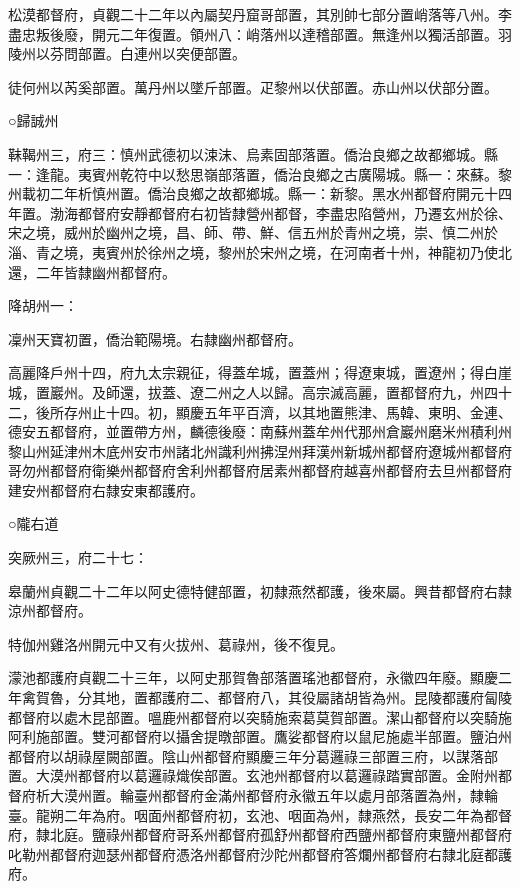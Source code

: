 \begin{pinyinscope}
 松漠都督府，貞觀二十二年以內屬契丹窟哥部置，其別帥七部分置峭落等八州。李盡忠叛後廢，開元二年復置。領州八：峭落州以達稽部置。無逢州以獨活部置。羽陵州以芬問部置。白連州以突便部置。



 徒何州以芮奚部置。萬丹州以墜斤部置。疋黎州以伏部置。赤山州以伏部分置。



 ○歸誠州



 靺鞨州三，府三：慎州武德初以涑沫、烏素固部落置。僑治良鄉之故都鄉城。縣一：逢龍。夷賓州乾符中以愁思嶺部落置，僑治良鄉之古廣陽城。縣一：來蘇。黎州載初二年析慎州置。僑治良鄉之故都鄉城。縣一：新黎。黑水州都督府開元十四年置。渤海都督府安靜都督府右初皆隸營州都督，李盡忠陷營州，乃遷玄州於徐、宋之境，威州於幽州之境，昌、師、帶、鮮、信五州於青州之境，崇、慎二州於淄、青之境，夷賓州於徐州之境，黎州於宋州之境，在河南者十州，神龍初乃使北還，二年皆隸幽州都督府。



 降胡州一：



 凜州天寶初置，僑治範陽境。右隸幽州都督府。



 高麗降戶州十四，府九太宗親征，得蓋牟城，置蓋州；得遼東城，置遼州；得白崖城，置巖州。及師還，拔蓋、遼二州之人以歸。高宗滅高麗，置都督府九，州四十二，後所存州止十四。初，顯慶五年平百濟，以其地置熊津、馬韓、東明、金連、德安五都督府，並置帶方州，麟德後廢：南蘇州蓋牟州代那州倉巖州磨米州積利州黎山州延津州木底州安市州諸北州識利州拂涅州拜漢州新城州都督府遼城州都督府哥勿州都督府衛樂州都督府舍利州都督府居素州都督府越喜州都督府去旦州都督府建安州都督府右隸安東都護府。



 ○隴右道



 突厥州三，府二十七：



 皋蘭州貞觀二十二年以阿史德特健部置，初隸燕然都護，後來屬。興昔都督府右隸涼州都督府。



 特伽州雞洛州開元中又有火拔州、葛祿州，後不復見。



 濛池都護府貞觀二十三年，以阿史那賀魯部落置瑤池都督府，永徽四年廢。顯慶二年禽賀魯，分其地，置都護府二、都督府八，其役屬諸胡皆為州。昆陵都護府匐陵都督府以處木昆部置。嗢鹿州都督府以突騎施索葛莫賀部置。潔山都督府以突騎施阿利施部置。雙河都督府以攝舍提暾部置。鷹娑都督府以鼠尼施處半部置。鹽泊州都督府以胡祿屋闕部置。陰山州都督府顯慶三年分葛邏祿三部置三府，以謀落部置。大漠州都督府以葛邏祿熾俟部置。玄池州都督府以葛邏祿踏實部置。金附州都督府析大漠州置。輪臺州都督府金滿州都督府永徽五年以處月部落置為州，隸輪臺。龍朔二年為府。咽面州都督府初，玄池、咽面為州，隸燕然，長安二年為都督府，隸北庭。鹽祿州都督府哥系州都督府孤舒州都督府西鹽州都督府東鹽州都督府叱勒州都督府迦瑟州都督府憑洛州都督府沙陀州都督府答爛州都督府右隸北庭都護府。




\end{pinyinscope}
